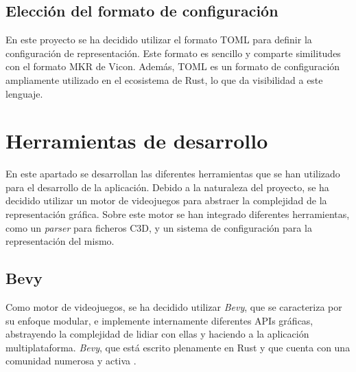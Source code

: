 \subsection{Elección del formato de configuración}

En este proyecto se ha decidido utilizar el formato \ac{TOML} para definir la configuración de representación. Este formato es sencillo y comparte similitudes con el formato MKR de Vicon. Además, \ac{TOML} es un formato de configuración ampliamente utilizado en el ecosistema de Rust, lo que da visibilidad a este lenguaje.

\section{Herramientas de desarrollo}

En este apartado se desarrollan las diferentes herramientas que se han utilizado para el desarrollo de la aplicación. Debido a la naturaleza del proyecto, se ha decidido utilizar un motor de videojuegos para abstraer la complejidad de la representación gráfica. Sobre este motor se han integrado diferentes herramientas, como un \textit{parser} para ficheros \ac{C3D}, y un sistema de configuración para la representación del mismo.


\subsection{Bevy} \label{subsec:bevy}
Como motor de videojuegos, se ha decidido utilizar \textit{Bevy}, que se caracteriza por su enfoque modular, e implemente internamente diferentes APIs gráficas, abstrayendo la complejidad de lidiar con ellas y haciendo a la aplicación multiplataforma. \textit{Bevy}, que está escrito plenamente en Rust y que cuenta con una comunidad numerosa y activa \autocite{BevyEngine}.

